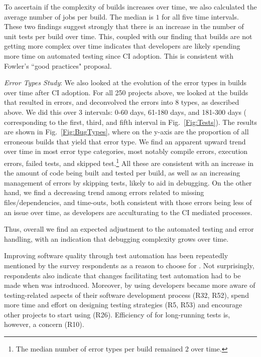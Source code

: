 To ascertain if the complexity of builds increases over time, we also calculated 
the average number of jobs per build.
The median is $1$ for all five time intervals.
These two findings suggest strongly that there is an increase in the number of 
unit tests per build over time.
This, coupled with our finding that builds are not getting more complex over time indicates that developers are likely spending more time on 
automated testing since CI adoption.
This is consistent with Fowler's ``good practices" proposal.



\smallskip\noindent \emph{Error Types Study}:
We also looked at the evolution of the error types in builds over time after CI 
adoption.
For all 250 projects above, we looked at the builds that resulted in errors, 
and deconvolved the errors into 8 types, as described above.
We did this over 3 intervals: 0-60 days, 61-180 days, and 181-300 days (\ie 
corresponding to the first, third, and fifth interval in Fig.~\ref{Fig:Tests}).
The results are shown in Fig.~\ref{Fig:BugTypes}, where on the y-axis are 
the proportion of all erroneous builds that yield that error type.
We find an apparent upward trend over time in most error type categories, 
most notably compile errors, execution errors, failed tests, and skipped 
test.\footnote{The median number of error types per build remained $2$ over 
time.}
All these are consistent with an increase in the amount of code being built 
and tested per build, as well as an increasing management of errors by 
skipping tests, likely to aid in debugging.
On the other hand, we find a decreasing trend among errors related to missing 
files/dependencies, and time-outs, both consistent with those errors being less 
of an issue over time, as developers are acculturating to the CI mediated 
processes.

Thus, overall we find an expected adjustment to the automated testing and 
error handling, with an indication that debugging complexity grows over time.




Improving software quality through test automation has been repeatedly mentioned by the survey respondents as a reason to choose for \Tvis. 
Not surprisingly, respondents also indicate that changes facilitating test automation had to be made when \Tvis was introduced. 
Moreover, by using \Tvis developers became more aware of testing-related aspects of their software development process (R32, R52), 
spend more time and effort on designing testing strategies (R5, R53) and encourage other projects to start using \Tvis (R26).
Efficiency of \Tvis for long-running tests is, however, a concern (R10).

